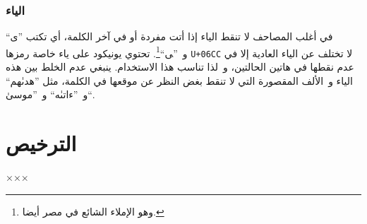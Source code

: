 \documentclass{article}
\begin{document}
\subsubsection{الياء}
في أغلب المصاحف لا تنقط الياء إذا أتت مفردة أو في آخر الكلمة، أي تكتب
”ی“ و ”‍ی“\footnote{وهو الإملاء الشائع في مصر أيضا.}. تحتوي يونيكود
على ياء خاصة رمزها \texttt{U+06CC} لا تختلف عن الياء العادية إلا في عدم
نقطها في هاتين الحالتين، و لذا تناسب هذا الاستخدام. ينبغي عدم الخلط بين
هذه الياء و الألف المقصورة التي لا تنقط بغض النظر عن موقعها في الكلمة،
مثل ”هدىٰهم“ و ”ءاتىٰه“ و ”موسىٰ“.

\section{الترخيص}
×××
\end{document}

